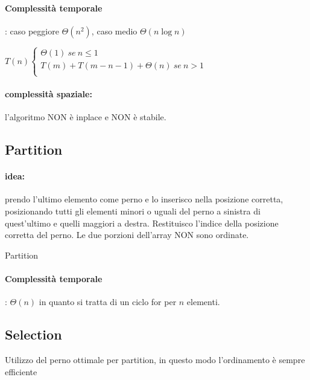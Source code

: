 \documentclass{article}
\begin{document}
\paragraph{Complessità temporale}: caso peggiore $\Theta(n^2)$, caso medio $\Theta(n \log n)$

$T(n)\begin{cases}
    \Theta(1) \ se \ n \leq 1\\
    T(m) + T(m-n-1) + \Theta(n) \ se \ n > 1\\
\end{cases}$

\paragraph{complessità spaziale:} l'algoritmo NON è inplace e NON è stabile.

\hypertarget{partition}{\subsection{Partition}} %
\paragraph{idea:} prendo l'ultimo elemento come perno e lo inserisco nella posizione corretta, posizionando tutti 
gli elementi minori o uguali del perno a sinistra di quest'ultimo e quelli maggiori a destra. Restituisco l'indice 
della posizione corretta del perno. Le due porzioni dell'array NON sono ordinate.

\begin{algorithm}[H]
\caption{Partition}
\end{algorithm}

\paragraph{Complessità temporale}: $\Theta(n)$ in quanto si tratta di un ciclo for per $n$ elementi.

\hypertarget{selection}{}\subsection{Selection} %
Utilizzo del perno ottimale per partition, in questo modo l'ordinamento è sempre efficiente
\end{document}
